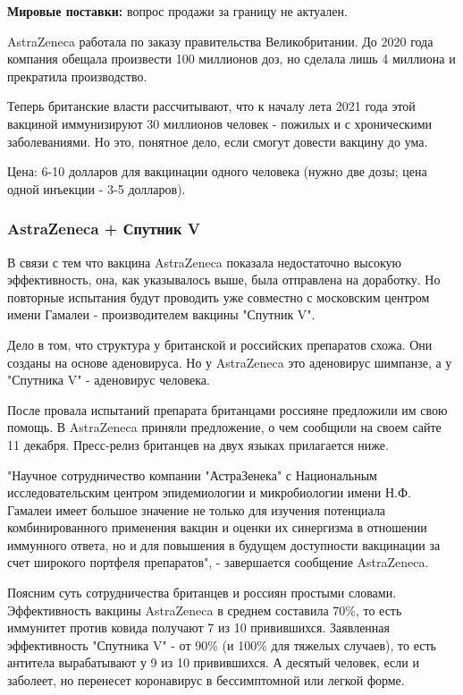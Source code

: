 \textbf{Мировые поставки:} вопрос продажи за границу не актуален.

AstraZeneca работала по заказу правительства Великобритании. До 2020 года
компания обещала произвести 100 миллионов доз, но сделала лишь 4 миллиона и
прекратила производство. 

Теперь британские власти рассчитывают, что к началу лета 2021 года этой
вакциной иммунизируют 30 миллионов человек - пожилых и с хроническими
заболеваниями. Но это, понятное дело, если смогут довести вакцину до ума. 

Цена: 6-10 долларов для вакцинации одного человека (нужно две дозы; цена одной
инъекции - 3-5 долларов). 

\subsubsection{AstraZeneca + Спутник V}

В связи с тем что вакцина AstraZeneca показала недостаточно высокую
эффективность, она, как указывалось выше, была отправлена на доработку. Но
повторные испытания будут проводить уже совместно с московским центром имени
Гамалеи - производителем вакцины "Спутник V". 

Дело в том, что структура у британской и российских препаратов схожа. Они
созданы на основе аденовируса. Но у AstraZeneca это аденовирус шимпанзе, а у
"Спутника V" - аденовирус человека. 

После провала испытаний препарата британцами россияне предложили им свою
помощь. В AstraZeneca приняли предложение, о чем сообщили на своем сайте 11
декабря. Пресс-релиз британцев на двух языках прилагается ниже. 

"Научное сотрудничество компании "АстраЗенека" с Национальным исследовательским
центром эпидемиологии и микробиологии имени Н.Ф. Гамалеи имеет большое значение
не только для изучения потенциала комбинированного применения вакцин и оценки
их синергизма в отношении иммунного ответа, но и для повышения в будущем
доступности вакцинации за счет широкого портфеля препаратов", - завершается
сообщение AstraZeneca. 

Поясним суть сотрудничества британцев и россиян простыми словами. Эффективность
вакцины AstraZeneca в среднем составила 70\%, то есть иммунитет против ковида
получают 7 из 10 привившихся. Заявленная эффективность "Спутника V" - от 90\%
(и 100\% для тяжелых случаев), то есть антитела вырабатывают у 9 из 10
привившихся.  А десятый человек, если и заболеет, но перенесет коронавирус в
бессимптомной или легкой форме. 

